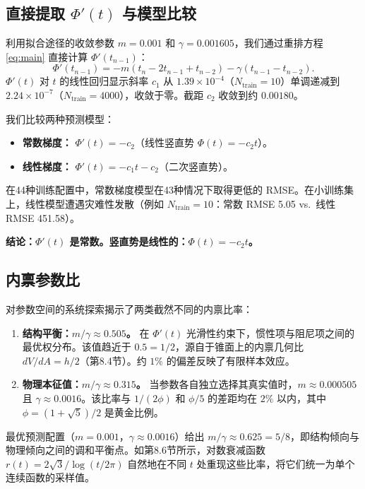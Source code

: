 \documentclass[12pt,a4paper]{article}
\begin{document}
\subsection{直接提取 $\Phi'(t)$ 与模型比较}

利用拟合途径的收敛参数 $m = 0.001$ 和 $\gamma = 0.001605$，我们通过重排方程 \eqref{eq:main} 直接计算 $\Phi'(t_{n-1})$：
\begin{equation}
\Phi'(t_{n-1}) = -m(t_n - 2t_{n-1} + t_{n-2}) - \gamma(t_{n-1} - t_{n-2}). \label{eq:rearranged}
\end{equation}
$\Phi'(t)$ 对 $t$ 的线性回归显示斜率 $c_1$ 从 $1.39 \times 10^{-4}$（$N_{\text{train}}=10$）单调递减到 $2.24 \times 10^{-7}$（$N_{\text{train}}=4000$），收敛于零。截距 $c_2$ 收敛到约 $0.00180$。

我们比较两种预测模型：
\begin{itemize}
\item \textbf{常数梯度：} $\Phi'(t) = -c_2$（线性竖直势 $\Phi(t) = -c_2 t$）。
\item \textbf{线性梯度：} $\Phi'(t) = -c_1 t - c_2$（二次竖直势）。
\end{itemize}

在44种训练配置中，常数梯度模型在43种情况下取得更低的 RMSE。在小训练集上，线性模型遭遇灾难性发散（例如 $N_{\text{train}}=10$：常数 RMSE 5.05 vs.\ 线性 RMSE 451.58）。

\textbf{结论：$\Phi'(t)$ 是常数。竖直势是线性的：$\Phi(t) = -c_2 t$。}

\subsection{内禀参数比}

对参数空间的系统探索揭示了两类截然不同的内禀比率：

\begin{enumerate}
\item \textbf{结构平衡：$m/\gamma \approx 0.505$。} 在 $\Phi'(t)$ 光滑性约束下，惯性项与阻尼项之间的最优权分布。该值趋近于 $0.5 = 1/2$，源自于锥面上的内禀几何比 $dV/dA = h/2$（第8.4节）。约 $1\%$ 的偏差反映了有限样本效应。

\item \textbf{物理本征值：$m/\gamma \approx 0.315$。} 当参数各自独立选择其真实值时，$m \approx 0.000505$ 且 $\gamma \approx 0.0016$。该比率与 $1/(2\phi)$ 和 $\phi/5$ 的差距均在 $2\%$ 以内，其中 $\phi = (1+\sqrt{5})/2$ 是黄金比例。
\end{enumerate}

最优预测配置（$m = 0.001$，$\gamma \approx 0.0016$）给出 $m/\gamma \approx 0.625 = 5/8$，即结构倾向与物理倾向之间的调和平衡点。如第8.6节所示，对数衰减函数 $r(t) = 2\sqrt{3}/\log(t/2\pi)$ 自然地在不同 $t$ 处重现这些比率，将它们统一为单个连续函数的采样值。
\end{document}
